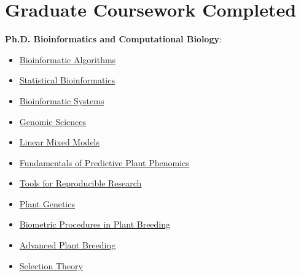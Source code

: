 \section*{Graduate Coursework Completed}

\textbf{Ph.D. Bioinformatics and Computational Biology}:
\vspace{-.7cm}
\begin{multicols}{3}
\begin{itemize}[left=0.2cm, itemsep=-0.15cm]
    \item \href{http://catalog.iastate.edu/search/?P=BCB\%20567}{{\color{black}Bioinformatic Algorithms}}
    \item \href{http://catalog.iastate.edu/search/?P=BCB\%20568}{{\color{black}Statistical Bioinformatics}}
    \item \href{http://catalog.iastate.edu/search/?P=BCB\%20570}{{\color{black}Bioinformatic Systems}}
    \item \href{http://guide.wisc.edu/search/?P=GENETICS\%20626}{{\color{black}Genomic Sciences}}
    \item \href{http://guide.wisc.edu/search/?P=DY\%20SCI\%20875}{{\color{black}Linear Mixed Models}}
    \item \href{https://www.predictivephenomicsinplants.iastate.edu/core-courses}{{\color{black}Fundamentals of Predictive Plant Phenomics}}
    \item \href{http://kbroman.org/Tools4RR/}{{\color{black}Tools for Reproducible Research}}
    \item \href{http://guide.wisc.edu/search/?P=GENETICS\%20631}{{\color{black}Plant Genetics}}
    \item \href{http://guide.wisc.edu/search/?P=AGRONOMY\%20811}{{\color{black}Biometric Procedures in Plant Breeding}}
    \item \href{http://guide.wisc.edu/search/?P=AGRONOMY\%20850}{{\color{black}Advanced Plant Breeding}}
    \item \href{http://guide.wisc.edu/search/?P=AGRONOMY\%20812}{{\color{black}Selection Theory}}
\end{itemize}
\end{multicols}
\vspace{-.4cm}

